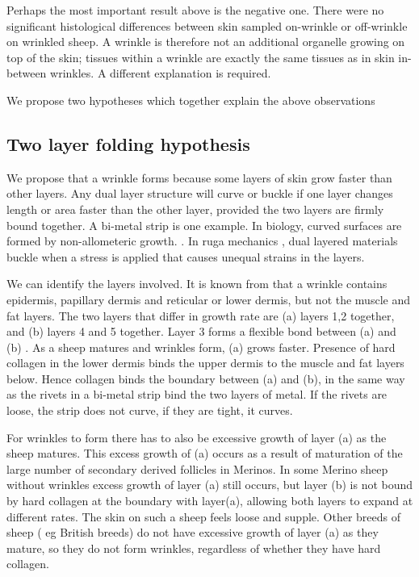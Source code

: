 \documentclass[]{interact}
\theoremstyle{plain}%
\theoremstyle{definition}
\theoremstyle{remark}
\begin{document}
\normalsize
Perhaps the most important result above is the negative one. There were no significant histological differences between skin sampled on-wrinkle  or off-wrinkle on wrinkled sheep. A wrinkle is therefore not an additional organelle growing on top of the skin; tissues within a wrinkle are exactly the same tissues as in skin in-between wrinkles.  A different explanation is required.

We propose two hypotheses which together explain the above observations

\subsection{Two layer folding hypothesis}

We propose that a wrinkle forms because some layers of skin grow faster than other layers.  Any dual layer structure will curve or buckle if one layer changes length or area faster than the other layer, provided the two layers are firmly bound together. A bi-metal strip is one example. In biology, curved surfaces are formed by non-allometeric growth. \citep{thompson-1917}. In ruga mechanics \citep{diab-2013}, dual layered materials buckle when a stress is applied that causes unequal strains in the layers.

We can identify the layers involved. It is known from \citep{mitchell-1984} that a wrinkle contains epidermis, papillary dermis and reticular or lower dermis, but not the muscle and fat layers.  The two layers that differ in growth rate are (a) layers 1,2 together, and (b) layers 4 and 5 together. Layer 3 forms a flexible bond between (a) and (b) . As a sheep matures and wrinkles form,  (a) grows faster.  Presence of hard collagen in the lower dermis binds the upper dermis to the muscle and fat layers below.  Hence collagen binds the boundary between (a) and (b), in the same way as the rivets in a bi-metal strip bind the two layers of metal. If the rivets are loose, the strip does not curve, if they are tight, it curves.

 For wrinkles to form there has to also be excessive growth of layer (a) as the sheep matures. This excess growth of (a) occurs as a result of maturation of the large number of secondary derived follicles in Merinos. In some Merino sheep without wrinkles excess growth of layer (a) still occurs, but layer (b)  is not bound by hard collagen at the boundary with layer(a), allowing both layers to expand at different rates. The skin on such a sheep feels loose and supple. Other breeds of sheep ( eg British breeds) do not have excessive growth of layer (a) as they mature, so they do not form wrinkles, regardless of whether they have hard collagen. 
\end{document}
